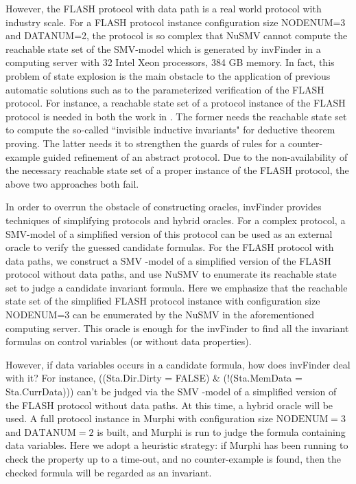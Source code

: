 \documentclass{llncs-new}
\newcommand{\bedt}[1]{{\color{black}#1}}
\begin{document}
However, the FLASH protocol with data path is a real world protocol with industry scale. For a FLASH protocol   instance configuration size NODENUM=3 and DATANUM=2, the protocol is so complex that NuSMV cannot compute the reachable state set of the SMV-model which is generated by {\sf invFinder} in a computing server  with 32 Intel Xeon processors, 384 GB memory. In fact, this problem of  state explosion is the main obstacle to the application of previous automatic solutions such as \cite{Arons2001,Lv2007} to the parameterized verification of the FLASH protocol. For instance, a reachable state set of a protocol instance of the FLASH protocol is needed in both the work in \cite{Arons2001,Lv2007}. The former needs the reachable state set to compute the so-called ``invisible inductive invariants" for deductive theorem proving. The latter needs it to strengthen
 the guards of rules for a counter-example guided refinement of an abstract protocol. Due to the non-availability of the necessary   reachable state set of a proper instance of the FLASH protocol, the above two approaches both fail.

 In order to overrun the obstacle of constructing oracles, {\sf invFinder} provides techniques of simplifying protocols and hybrid oracles. For a complex protocol, a SMV-model of a  simplified version of this protocol can be used as an external oracle to verify the guessed candidate formulas. For the FLASH protocol with data paths,  we construct a SMV -model of a simplified version of the FLASH protocol without data paths, and use NuSMV to enumerate its reachable state set to judge a candidate invariant formula. Here we  emphasize that the reachable state set of the simplified FLASH protocol  instance  with configuration size NODENUM=3 can be enumerated by the NuSMV in the aforementioned computing server. This oracle is enough for the {\sf invFinder} to find all the invariant formulas on control variables (or without data properties).

 However, if  data variables occurs in a candidate formula, how does {\sf invFinder} deal with it?  For instance, ((Sta.Dir.Dirty = FALSE) \& (!(Sta.MemData = Sta.CurrData))) can't be judged via the SMV -model of a simplified version of the FLASH protocol without data paths. At this time, a hybrid oracle will be used.  A full protocol instance in Murphi  with configuration size $\mathrm{NODENUM}=3$ and $\mathrm{DATANUM}=2$ \bedt{is built}, and  Murphi is run to judge the formula containing data variables. Here we adopt a \bedt{heuristic} strategy: \bedt{if Murphi has been running to check the property up to a time-out,} and no counter-example is found, then the checked formula will be regarded as an invariant.
\end{document}
